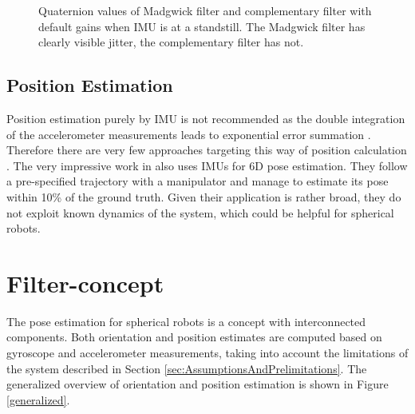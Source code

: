 \documentclass[letterpaper, 10 pt, conference]{ieeeconf}  %
\begin{document}
\begin{figure}
\caption{Quaternion values of Madgwick filter and complementary filter with default gains when IMU is at a standstill. The Madgwick filter has clearly visible jitter, the complementary filter has not.}
\label{madgVsComp1}
\end{figure}



\subsection{Position Estimation}
Position estimation purely by IMU is not recommended as the double integration of the accelerometer measurements leads to exponential error summation \cite{thong2004numerical}.
Therefore there are very few approaches targeting this way of position calculation \cite{kok2017IMU}.
The very impressive work in \cite{valencia2017simpleIMU} also uses IMUs for 6D pose estimation.
They follow a pre-specified trajectory with a manipulator and manage to estimate its pose within 10\% of the ground truth.
Given their application is rather broad, they do not exploit known dynamics of the system, which could be helpful for spherical robots.


\section{Filter-concept}
The pose estimation for spherical robots is a concept with interconnected components.
Both orientation and position estimates are computed based on gyroscope and accelerometer measurements, taking into account the limitations of the system described in Section \ref{sec:AssumptionsAndPrelimitations}.
The generalized overview of orientation and position estimation is shown in Figure \ref{generalized}.
\end{document}
